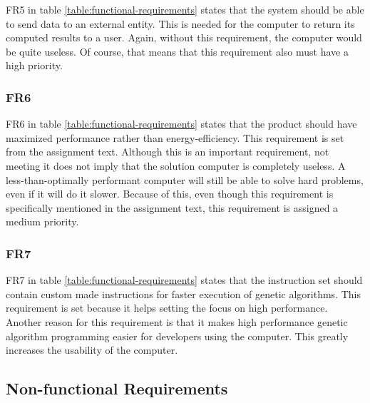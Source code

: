 FR5 in table \vref{table:functional-requirements} states that the system should be able to send data to an external entity.
This is needed for the computer to return its computed results to a user.
Again, without this requirement, the computer would be quite useless.
Of course, that means that this requirement also must have a high priority.

\subsubsection{FR6}

FR6 in table \vref{table:functional-requirements} states that the product should have maximized performance rather than energy-efficiency.
This requirement is set from the assignment text.
Although this is an important requirement, not meeting it does not imply that the solution computer is completely useless.
A less-than-optimally performant computer will still be able to solve hard problems, even if it will do it slower.
Because of this, even though this requirement is specifically mentioned in the assignment text, this requirement is assigned a medium priority.

\subsubsection{FR7}

FR7 in table \vref{table:functional-requirements} states that the instruction set should contain custom made instructions for faster execution of genetic algorithms.
This requirement is set because it helps setting the focus on high performance.
Another reason for this requirement is that it makes high performance genetic algorithm programming easier for developers using the computer.
This greatly increases the usability of the computer.

\subsection{Non-functional Requirements}

